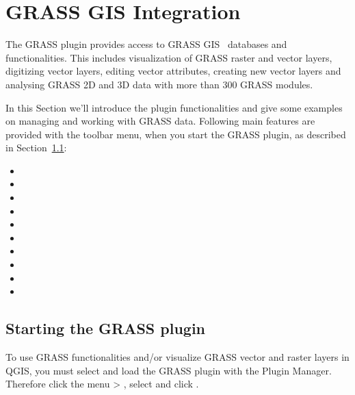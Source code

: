 \section{GRASS GIS Integration}\label{sec:grass}


The GRASS plugin provides access to GRASS GIS~\cite{GRASSweb} databases and 
functionalities. This includes visualization of GRASS raster and vector 
layers, digitizing vector layers, editing vector attributes, creating new 
vector layers and analysing GRASS 2D and 3D data with more than 300 GRASS 
modules.

In this Section we'll introduce the plugin functionalities and give some 
examples on managing and working with GRASS data. Following main features 
are provided with the toolbar menu, when you start the GRASS plugin, as 
described in Section~\ref{sec:starting_grass}:
 
\begin{itemize}
\item {}
\item {}
\item {}
\item {}
\item {}
\item {}
\item {}
\item {}
\item {} 
\item {}
\end{itemize}

\subsection{Starting the GRASS plugin}\label{sec:starting_grass}

To use GRASS functionalities and/or visualize GRASS vector and raster layers 
in QGIS, you must select and load the GRASS plugin with the Plugin Manager. 
Therefore click the menu  > , 
select  and click . 

